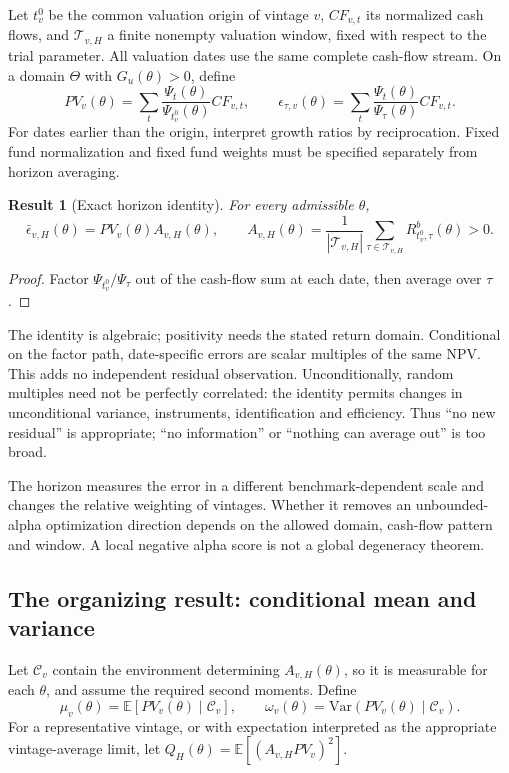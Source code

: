 \documentclass[11pt]{article}
\newcommand{\E}{\mathbb{E}}
\newcommand{\Var}{\mathrm{Var}}
\theoremstyle{plain}
\newtheorem{result}{Result}[section]
\theoremstyle{definition}
\begin{document}
Let $t_v^0$ be the common valuation origin of vintage $v$, $CF_{v,t}$ its normalized cash flows, and $\mathcal T_{v,H}$ a finite nonempty valuation window, fixed with respect to the trial parameter. All valuation dates use the same complete cash-flow stream. On a domain $\Theta$ with $G_u(\theta)>0$, define
\[
PV_v(\theta)=\sum_t\frac{\Psi_t(\theta)}{\Psi_{t_v^0}(\theta)}CF_{v,t},\qquad
\epsilon_{\tau,v}(\theta)=\sum_t\frac{\Psi_t(\theta)}{\Psi_\tau(\theta)}CF_{v,t}.
\]
For dates earlier than the origin, interpret growth ratios by reciprocation. Fixed fund normalization and fixed fund weights must be specified separately from horizon averaging.

\begin{result}[Exact horizon identity]
\label{res:identity}
For every admissible $\theta$,
\begin{equation}
\label{eq:identity}
\bar\epsilon_{v,H}(\theta)
=PV_v(\theta)A_{v,H}(\theta),\qquad
A_{v,H}(\theta)=\frac{1}{|\mathcal T_{v,H}|}\sum_{\tau\in\mathcal T_{v,H}}R^b_{t_v^0,\tau}(\theta)>0.
\end{equation}
\end{result}
\begin{proof}
Factor $\Psi_{t_v^0}/\Psi_\tau$ out of the cash-flow sum at each date, then average over $\tau$.
\end{proof}

The identity is algebraic; positivity needs the stated return domain. Conditional on the factor path, date-specific errors are scalar multiples of the same NPV. This adds no independent residual observation. Unconditionally, random multiples need not be perfectly correlated: the identity permits changes in unconditional variance, instruments, identification and efficiency. Thus ``no new residual'' is appropriate; ``no information'' or ``nothing can average out'' is too broad.

The horizon measures the error in a different benchmark-dependent scale and changes the relative weighting of vintages. Whether it removes an unbounded-alpha optimization direction depends on the allowed domain, cash-flow pattern and window. A local negative alpha score is not a global degeneracy theorem.

\subsection{The organizing result: conditional mean and variance}

Let $\mathcal C_v$ contain the environment determining $A_{v,H}(\theta)$, so it is measurable for each $\theta$, and assume the required second moments. Define
\[
\mu_v(\theta)=\E[PV_v(\theta)\mid\mathcal C_v],\qquad
\omega_v(\theta)=\Var(PV_v(\theta)\mid\mathcal C_v).
\]
For a representative vintage, or with expectation interpreted as the appropriate vintage-average limit, let $Q_H(\theta)=\E[(A_{v,H}PV_v)^2]$.
\end{document}
